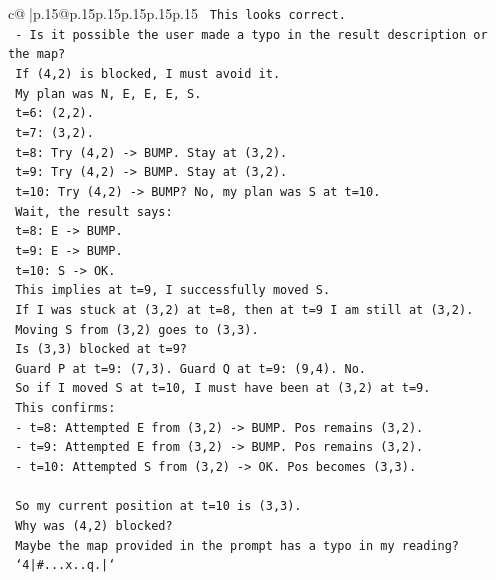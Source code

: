 \documentclass{article}
\begin{document}
{\begin{supertabular}{c@{$\;$}|p{.15\linewidth}@{}p{.15\linewidth}p{.15\linewidth}p{.15\linewidth}p{.15\linewidth}p{.15\linewidth}}
{{{\texttt{      This looks correct.} \\
\texttt{    {-} Is it possible the user made a typo in the result description or the map?} \\
\texttt{      If (4,2) is blocked, I must avoid it.} \\
\texttt{      My plan was N, E, E, E, S.} \\
\texttt{      t=6: (2,2).} \\
\texttt{      t=7: (3,2).} \\
\texttt{      t=8: Try (4,2) {-}> BUMP. Stay at (3,2).} \\
\texttt{      t=9: Try (4,2) {-}> BUMP. Stay at (3,2).} \\
\texttt{      t=10: Try (4,2) {-}> BUMP? No, my plan was S at t=10.} \\
\texttt{      Wait, the result says:} \\
\texttt{      t=8: E {-}> BUMP.} \\
\texttt{      t=9: E {-}> BUMP.} \\
\texttt{      t=10: S {-}> OK.} \\
\texttt{      This implies at t=9, I successfully moved S.} \\
\texttt{      If I was stuck at (3,2) at t=8, then at t=9 I am still at (3,2).} \\
\texttt{      Moving S from (3,2) goes to (3,3).} \\
\texttt{      Is (3,3) blocked at t=9?} \\
\texttt{      Guard P at t=9: (7,3). Guard Q at t=9: (9,4). No.} \\
\texttt{      So if I moved S at t=10, I must have been at (3,2) at t=9.} \\
\texttt{      This confirms:} \\
\texttt{      {-} t=8: Attempted E from (3,2) {-}> BUMP. Pos remains (3,2).} \\
\texttt{      {-} t=9: Attempted E from (3,2) {-}> BUMP. Pos remains (3,2).} \\
\texttt{      {-} t=10: Attempted S from (3,2) {-}> OK. Pos becomes (3,3).} \\
\\ 
\texttt{      So my current position at t=10 is (3,3).} \\
\texttt{      Why was (4,2) blocked?} \\
\texttt{      Maybe the map provided in the prompt has a typo in my reading?} \\
\texttt{      `4|\#...x..q.|`} \\
}}}
\end{supertabular}}
\end{document}

